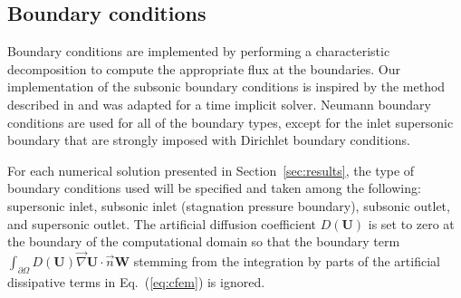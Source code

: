 \documentclass[review,10pt]{elsarticle}
\newcommand{\grad}{\vec{\nabla}}
\newcommand{\eqt}[1]{Eq.~(\ref{#1})}                     %
\newcommand{\sct}[1]{Section~\ref{#1}}                   %
\newcommand{\tcr}[1]{\textcolor{red}{#1}}
\newcommand{\tcb}[1]{\textcolor{blue}{#1}}
\begin{document}
\subsection{Boundary conditions} \label{sec:bc}
Boundary conditions are implemented by performing a characteristic decomposition to compute the 
appropriate flux at the boundaries.
Our implementation of the subsonic boundary conditions is inspired by the method described in \cite{SEM} 
and was adapted for a time implicit solver. Neumann boundary conditions are used for all of the 
boundary types, except for the inlet supersonic boundary that are strongly imposed with Dirichlet boundary conditions.

For each numerical solution presented in \sct{sec:results}, the type of boundary conditions used 
will be specified and taken among the following: supersonic inlet, subsonic inlet (stagnation pressure boundary), 
subsonic outlet, and supersonic outlet. 
The artificial diffusion coefficient $D(\mathbf  U)$ is set to zero at the boundary of the computational 
domain so that the boundary term 
$\int_{\partial \Omega} D(\mathbf  U) \grad \mathbf  U \cdot \vec{n} \mathbf W$ stemming from the 
integration by parts of the artificial dissipative terms in \eqt{eq:cfem} is ignored.
%
\end{document}
